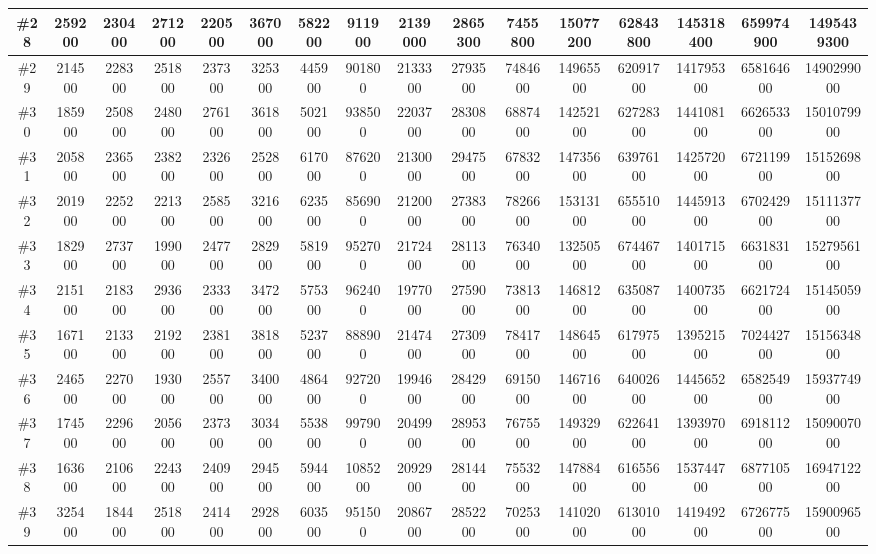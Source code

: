 \documentclass[titlepage]{article}
\begin{document}
\begin{landscape}
\begin{table}[h]
\begin{tabular}{|c|c|c|c|c|c|c|c|c|c|c|c|c|c|c|c|}
			\hline
			\#28     & 259200 & 230400 & 271200 & 220500 & 367000 & 582200 & 911900  & 2139000 & 2865300 & 7455800 & 15077200 & 62843800 & 145318400 & 659974900 & 1495439300  \\ 
			\hline
			\#29     & 214500 & 228300 & 251800 & 237300 & 325300 & 445900 & 901800  & 2133300 & 2793500 & 7484600 & 14965500 & 62091700 & 141795300 & 658164600 & 1490299000  \\ 
			\hline
			\#30     & 185900 & 250800 & 248000 & 276100 & 361800 & 502100 & 938500  & 2203700 & 2830800 & 6887400 & 14252100 & 62728300 & 144108100 & 662653300 & 1501079900  \\ 
			\hline
			\#31     & 205800 & 236500 & 238200 & 232600 & 252800 & 617000 & 876200  & 2130000 & 2947500 & 6783200 & 14735600 & 63976100 & 142572000 & 672119900 & 1515269800  \\ 
			\hline
			\#32     & 201900 & 225200 & 221300 & 258500 & 321600 & 623500 & 856900  & 2120000 & 2738300 & 7826600 & 15313100 & 65551000 & 144591300 & 670242900 & 1511137700  \\ 
			\hline
			\#33     & 182900 & 273700 & 199000 & 247700 & 282900 & 581900 & 952700  & 2172400 & 2811300 & 7634000 & 13250500 & 67446700 & 140171500 & 663183100 & 1527956100  \\ 
			\hline
			\#34     & 215100 & 218300 & 293600 & 233300 & 347200 & 575300 & 962400  & 1977000 & 2759000 & 7381300 & 14681200 & 63508700 & 140073500 & 662172400 & 1514505900  \\ 
			\hline
			\#35     & 167100 & 213300 & 219200 & 238100 & 381800 & 523700 & 888900  & 2147400 & 2730900 & 7841700 & 14864500 & 61797500 & 139521500 & 702442700 & 1515634800  \\ 
			\hline
			\#36     & 246500 & 227000 & 193000 & 255700 & 340000 & 486400 & 927200  & 1994600 & 2842900 & 6915000 & 14671600 & 64002600 & 144565200 & 658254900 & 1593774900  \\ 
			\hline
			\#37     & 174500 & 229600 & 205600 & 237300 & 303400 & 553800 & 997900  & 2049900 & 2895300 & 7675500 & 14932900 & 62264100 & 139397000 & 691811200 & 1509007000  \\ 
			\hline
			\#38     & 163600 & 210600 & 224300 & 240900 & 294500 & 594400 & 1085200 & 2092900 & 2814400 & 7553200 & 14788400 & 61655600 & 153744700 & 687710500 & 1694712200  \\ 
			\hline
			\#39     & 325400 & 184400 & 251800 & 241400 & 292800 & 603500 & 951500  & 2086700 & 2852200 & 7025300 & 14102000 & 61301000 & 141949200 & 672677500 & 1590096500  \\ 

\end{tabular}
\end{table}
\end{landscape}
\end{document}
